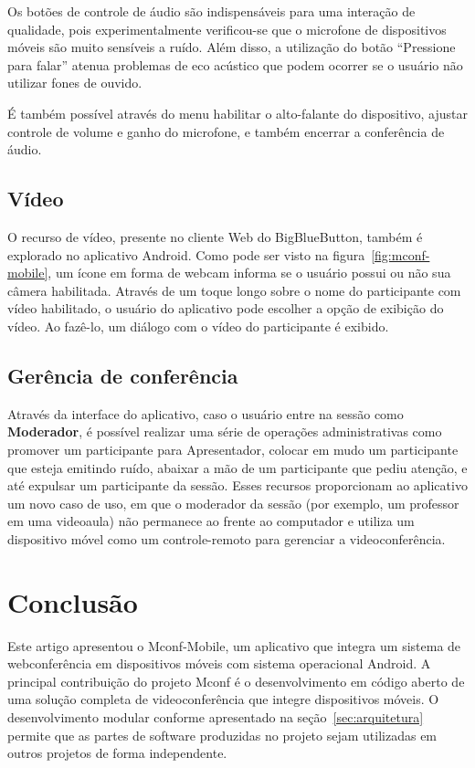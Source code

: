 \documentclass{acm_proc_article-sp}
\begin{document}
Os botões de controle de áudio são indispensáveis para uma interação de qualidade, pois experimentalmente verificou-se que o microfone de dispositivos móveis são muito sensíveis a ruído. Além disso, a utilização do botão ``Pressione para falar'' atenua problemas de eco acústico que podem ocorrer se o usuário não utilizar fones de ouvido.

É também possível através do menu habilitar o alto-falante do dispositivo, ajustar controle de volume e ganho do microfone, e também encerrar a conferência de áudio.

\subsection{Vídeo}

O recurso de vídeo, presente no cliente Web do BigBlueButton, também é explorado no aplicativo Android. Como pode ser visto na figura~\ref{fig:mconf-mobile}, um ícone em forma de webcam informa se o usuário possui ou não sua câmera habilitada. Através de um toque longo sobre o nome do participante com vídeo habilitado, o usuário do aplicativo pode escolher a opção de exibição do vídeo. Ao fazê-lo, um diálogo com o vídeo do participante é exibido.

\subsection{Gerência de conferência}

Através da interface do aplicativo, caso o usuário entre na sessão como \textbf{Moderador}, é possível realizar uma série de operações administrativas como promover um participante para Apresentador, colocar em mudo um participante que esteja emitindo ruído, abaixar a mão de um participante que pediu atenção, e até expulsar um participante da sessão. Esses recursos proporcionam ao aplicativo um novo caso de uso, em que o moderador da sessão (por exemplo, um professor em uma videoaula) não permanece ao frente ao computador e utiliza um dispositivo móvel como um controle-remoto para gerenciar a videoconferência.

\section{Conclusão}

Este artigo apresentou o Mconf-Mobile, um aplicativo que integra um sistema de webconferência em dispositivos móveis com sistema operacional Android. A principal contribuição do projeto Mconf é o desenvolvimento em código aberto de uma solução completa de videoconferência que integre dispositivos móveis. O desenvolvimento modular conforme apresentado na seção~\ref{sec:arquitetura} permite que as partes de software produzidas no projeto sejam utilizadas em outros projetos de forma independente.
\end{document}
